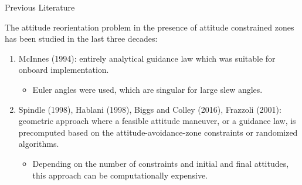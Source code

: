 \documentclass{beamer}
\begin{document}
\begin{frame}
\begin{block}{Previous Literature}
	
	The attitude reorientation problem in the presence of attitude constrained zones has been studied in the last three decades:
	\begin{enumerate} 
		
		\item McInnes (1994): entirely analytical guidance law which was suitable for onboard implementation. 
		\begin{itemize}
			\item Euler angles were used, which are singular for large slew angles. 
		\end{itemize}
		\item Spindle (1998), Hablani (1998), Biggs and Colley (2016), Frazzoli (2001): geometric approach where a feasible attitude maneuver, or a guidance law, is precomputed based on the attitude-avoidance-zone constraints or randomized algorithms. 
		\begin{itemize}
			\item Depending on the number of constraints and initial and final attitudes, this approach can be computationally expensive. 
		\end{itemize}
		
	\end{enumerate} 

\end{block}
\end{frame}
	
\end{document}
